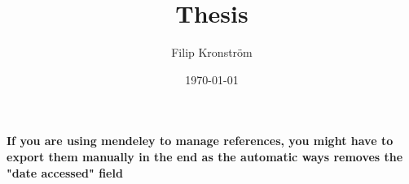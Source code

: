\documentclass[12pt, openany]{book}
\title{Thesis}
\author{Filip Kronström}
\date{\today}
\begin{document}
\maketitle
{}



\textbf{If you are using mendeley to manage references, you might have to export them manually in the end as the automatic ways removes the "date accessed" field}
\printbibliography
\end{document}
